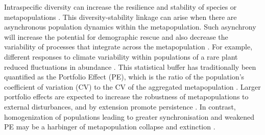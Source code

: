 \documentclass{revtex4}
\begin{document}
Intraspecific diversity can increase the resilience and stability of species or metapopulations \citep{Gibert:2016cu}. 
This diversity-stability linkage can arise when there are asynchronous population dynamics within the metapopulation. 
Such asynchrony will increase the potential for demographic rescue \citep{Brown:1977gk,Earn:2000fm} and also decrease the variability of processes that integrate across the metapopulation \citep{Anonymous:2015gf}. 
For example, different responses to climate variability within populations of a rare plant reduced fluctuations in abundance \citep{Abbott:2017hl}. 
This statistical buffer has traditionally been quantified as the Portfolio Effect (PE), which is the ratio of the population's coefficient of variation (CV) to the CV of the aggregated metapopulation \citep{Thibaut:2012km}. 
Larger portfolio effects are expected to increase the robustness of metapopulations to external disturbances, and by extension promote persistence \citep{Thibaut:2012km}.
In contrast, homogenization of populations leading to greater synchronisation and weakened PE may be a harbinger of metapopulation collapse and extinction \citep{Carlson:2011ce}.
\end{document}
